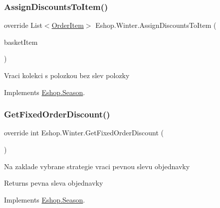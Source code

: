 \subsubsection{\texorpdfstring{AssignDiscountsToItem()}{AssignDiscountsToItem()}}
{\footnotesize\ttfamily override List$<$\mbox{\hyperlink{class_eshop_1_1_order_item}{Order\+Item}}$>$ Eshop.\+Winter.\+Assign\+Discounts\+To\+Item (\begin{DoxyParamCaption}\item[{Key\+Value\+Pair$<$ \mbox{\hyperlink{class_eshop_1_1_product}{Product}}, int $>$}]{basket\+Item }\end{DoxyParamCaption})\hspace{0.3cm}{\ttfamily [virtual]}}



Vraci kolekci s polozkou bez slev polozky 



Implements \mbox{\hyperlink{class_eshop_1_1_season}{Eshop.\+Season}}.

\mbox{\label{class_eshop_1_1_winter_a0ddc9d5825968a20d65e8dfbed375c86}} 
\subsubsection{\texorpdfstring{GetFixedOrderDiscount()}{GetFixedOrderDiscount()}}
{\footnotesize\ttfamily override int Eshop.\+Winter.\+Get\+Fixed\+Order\+Discount (\begin{DoxyParamCaption}{ }\end{DoxyParamCaption})\hspace{0.3cm}{\ttfamily [virtual]}}



Na zaklade vybrane strategie vraci pevnou slevu objednavky 

\begin{DoxyReturn}{Returns}
pevna sleva objednavky
\end{DoxyReturn}


Implements \mbox{\hyperlink{class_eshop_1_1_season}{Eshop.\+Season}}.

\mbox{\label{class_eshop_1_1_winter_acb309c44d4b485d42b00e4b9ee0b29ba}} 
